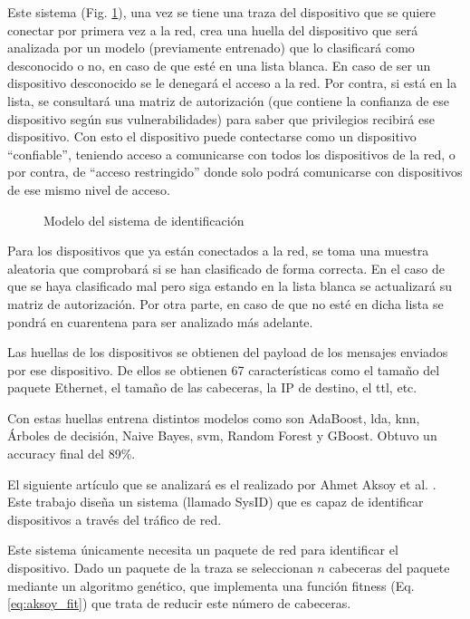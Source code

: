 Este sistema (Fig. \ref{fig:diam_hamad}), una vez se tiene una traza del dispositivo que se quiere conectar por primera vez a la red, crea una huella del dispositivo que será analizada por un modelo (previamente entrenado) que lo clasificará como desconocido o no, en caso de que esté en una lista blanca. En caso de ser un dispositivo desconocido se le denegará el acceso a la red. Por contra, si está en la lista, se consultará una matriz de autorización (que contiene la confianza de ese dispositivo según sus vulnerabilidades) para saber que privilegios recibirá ese dispositivo. Con esto el dispositivo puede contectarse como un dispositivo ``confiable'', teniendo acceso a comunicarse con todos los dispositivos de la red, o por contra, de ``acceso restringido'' donde solo podrá comunicarse con dispositivos de ese mismo nivel de acceso.

\begin{figure}[htpb!]
    \centering
    \resizebox{0.6\textwidth}{!}{
        
    }
    \caption{Modelo del sistema de identificación \cite{hamad2019iot}}
    \label{fig:diam_hamad}
\end{figure}

Para los dispositivos que ya están conectados a la red, se toma una muestra aleatoria que comprobará si se han clasificado de forma correcta. En el caso de que se haya clasificado mal pero siga estando en la lista blanca se actualizará su matriz de autorización. Por otra parte, en caso de que no esté en dicha lista se pondrá en cuarentena para ser analizado más adelante.

Las huellas de los dispositivos se obtienen del payload de los mensajes enviados por ese dispositivo. De ellos se obtienen 67 características como el tamaño del paquete Ethernet, el tamaño de las cabeceras, la IP de destino, el \acrfull{ttl}, etc.

Con estas huellas entrena distintos modelos como son AdaBoost, \acrfull{lda}, \acrshort{knn}, Árboles de decisión, Naive Bayes, \acrshort{svm}, Random Forest y GBoost. Obtuvo un accuracy final del 89\%.

El siguiente artículo que se analizará es el realizado por Ahmet Aksoy et al. \cite{aksoy2019automated}. Este trabajo diseña un sistema (llamado SysID) que es capaz de identificar dispositivos a través del tráfico de red. 

Este sistema únicamente necesita un paquete de red para identificar el dispositivo. Dado un paquete de la traza se seleccionan $n$ cabeceras del paquete mediante un algoritmo genético, que implementa una función fitness (Eq. \ref{eq:aksoy_fit}) que trata de reducir este número de cabeceras. 

